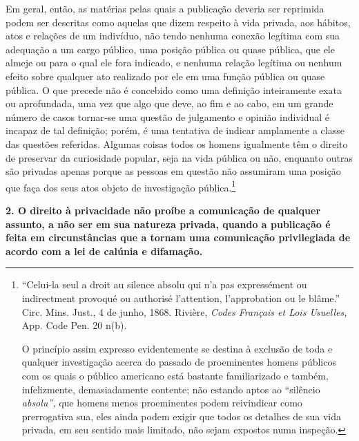 Em geral, então, as matérias pelas quais a publicação deveria ser
reprimida podem ser descritas como aquelas que dizem respeito à vida
privada, aos hábitos, atos e relações de um indivíduo, não tendo nenhuma
conexão legítima com sua adequação a um cargo público, uma posição
pública ou quase pública, que ele almeje ou para o qual ele fora
indicado, e nenhuma relação legítima ou nenhum efeito sobre qualquer ato
realizado por ele em uma função pública ou quase pública. O que precede
não é concebido como uma definição inteiramente exata ou aprofundada,
uma vez que algo que deve, ao fim e ao cabo, em um grande número de
casos tornar-se uma questão de julgamento e opinião individual é incapaz
de tal definição; porém, é uma tentativa de indicar amplamente a classe
das questões referidas. Algumas coisas todos os homens igualmente têm o
direito de preservar da curiosidade popular, seja na vida pública ou
não, enquanto outras são privadas apenas porque as pessoas em questão
não assumiram uma posição que faça dos seus atos objeto de investigação
pública.\footnote{``Celui-la seul a droit au silence absolu qui n'a pas
  expressément ou indirectment provoqué ou authorisé l'attention,
  l'approbation ou le blâme.'' Circ. Mins. Just., 4 de junho, 1868.
  Rivière, \emph{Codes Français et Lois Usuelles,} App. Code Pen. 20
  n(b).

  O princípio assim expresso evidentemente se destina à exclusão de toda
  e qualquer investigação acerca do passado de proeminentes homens
  públicos com os quais o público americano está bastante familiarizado
  e também, infelizmente, demasiadamente contente; não estando aptos ao
  ``silêncio \emph{absolu'',} que homens menos proeminentes podem
  reivindicar como prerrogativa sua, eles ainda podem exigir que todos
  os detalhes de sua vida privada, em seu sentido mais limitado, não
  sejam expostos numa inspeção.}

\textbf{2. O direito à privacidade não proíbe a comunicação de qualquer
assunto, a não ser em sua natureza privada, quando a publicação é feita
em circunstâncias que a tornam uma comunicação privilegiada de acordo
com a lei de calúnia e difamação.}

